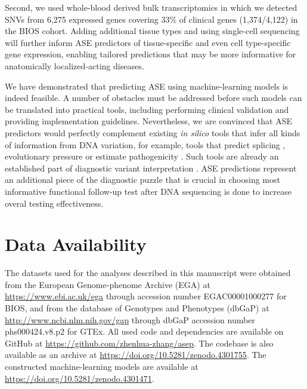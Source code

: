 \documentclass{book}
\begin{document}
\begin{refsection}
Second, we used whole-blood derived bulk transcriptomics in which we detected SNVs from 6,275 expressed genes covering 33\% of clinical genes (1,374/4,122) in the BIOS cohort.
Adding additional tissue types and using single-cell sequencing will further inform ASE predictors of tissue-specific \cite{Lee2009A} and even cell type-specific \cite{Aguirre2020Deconvolution} gene expression, enabling tailored predictions that may be more informative for anatomically localized-acting diseases.

We have demonstrated that predicting ASE using machine-learning models is indeed feasible.
A number of obstacles must be addressed before such models can be translated into practical tools, including performing clinical validation and providing implementation guidelines.
Nevertheless, we are convinced that ASE predictors would perfectly complement existing \textit{in silico} tools that infer all kinds of information from DNA variation, for example, tools that predict splicing \cite{Jagadeesh2019S}, evolutionary pressure \cite{Kircher2014A} or estimate pathogenicity \cite{Li2020CAPICE}.
Such tools are already an established part of diagnostic variant interpretation \cite{Richards2015Standards}.
ASE predictions represent an additional piece of the diagnostic puzzle that is crucial in choosing most informative functional follow-up test after DNA sequencing is done to increase overal testing effectiveness.

\section*{Data Availability}
The datasets used for the analyses described in this manuscript were obtained from the European Genome-phenome Archive (EGA) at \url{https://www.ebi.ac.uk/ega} through accession number EGAC00001000277 for BIOS, and from the database of Genotypes and Phenotypes (dbGaP) at \url{http://www.ncbi.nlm.nih.gov/gap} through dbGaP accession number phs000424.v8.p2 for GTEx.
All used code and dependencies are available on GitHub at \url{https://github.com/zhenhua-zhang/asep}.
The codebase is also available as an archive at \url{https://doi.org/10.5281/zenodo.4301755}.
The constructed machine-learning models are available at \url{https://doi.org/10.5281/zenodo.4301471}.


\end{refsection}
\end{document}
